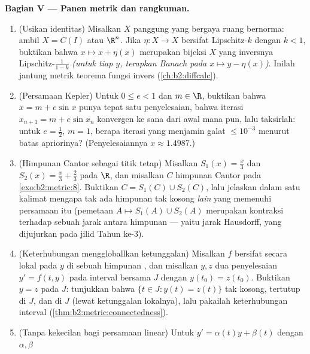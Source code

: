 \begin{problem}
\medskip
\noindent\textbf{Bagian V --- Panen metrik dan rangkuman.}
\begin{enumerate}[resume]
  \item (Usikan identitas) Misalkan $X$ panggung  yang
        bergaya ruang bernorma: ambil $X = C(I)$ atau $\R^n$. Jika
        $\eta \colon X \to X$ bersifat Lipschitz-$k$ dengan $k < 1$,
        buktikan bahwa $x \mapsto x + \eta(x)$ merupakan bijeksi $X$
        yang inversnya Lipschitz-$\frac1{1-k}$ \emph{(untuk tiap
        $y$, terapkan Banach pada $x \mapsto y - \eta(x)$)}. Inilah
        jantung metrik teorema fungsi invers
        (\cref{ch:b2:diffcalc}).
  \item (Persamaan Kepler) Untuk $0 \leq e < 1$ dan $m \in \R$,
        buktikan bahwa $x = m + e\sin x$ punya tepat satu penyelesaian,
        bahwa iterasi $x_{n+1} = m + e\sin x_n$ konvergen
        ke sana dari awal mana pun, lalu taksirlah: untuk $e = \frac12$,
        $m = 1$, berapa iterasi yang menjamin galat $\leq
        10^{-3}$ menurut batas apriorinya? (Penyelesaiannya $x
        \approx 1.4987$.)
  \item (Himpunan Cantor sebagai titik tetap) Misalkan $S_1(x) = \frac
        x3$ dan $S_2(x) = \frac x3 + \frac23$ pada $\R$, dan misalkan
        $C$ himpunan Cantor pada \cref{exo:b2:metric:8}. Buktikan
        $C = S_1(C) \cup S_2(C)$, lalu jelaskan dalam satu kalimat
        mengapa tak ada himpunan  tak kosong \emph{lain} yang
        memenuhi persamaan itu (pemetaan $A \mapsto S_1(A) \cup S_2(A)$
        merupakan kontraksi terhadap sebuah jarak antara himpunan
         --- yaitu jarak Hausdorff, yang dijujurkan pada jilid Tahun ke-3).
  \item (Keterhubungan menggloballkan ketunggalan) Misalkan $f$ bersifat
         secara lokal pada $y$ di sebuah himpunan , dan
        misalkan $y, z$ dua penyelesaian $y' = f(t, y)$ pada interval
        bersama $J$ dengan $y(t_0) = z(t_0)$. Buktikan $y = z$ pada $J$:
        tunjukkan bahwa $\{t \in J : y(t) = z(t)\}$ tak kosong, tertutup
        di $J$, dan  di $J$ (lewat ketunggalan lokalnya), lalu
        pakailah keterhubungan interval
        (\cref{thm:b2:metric:connectedness}).
  \item (Tanpa kekecilan bagi persamaan linear) Untuk $y' =
        \alpha(t)y + \beta(t)$ dengan $\alpha, \beta$ 

\end{enumerate}
\end{problem}

